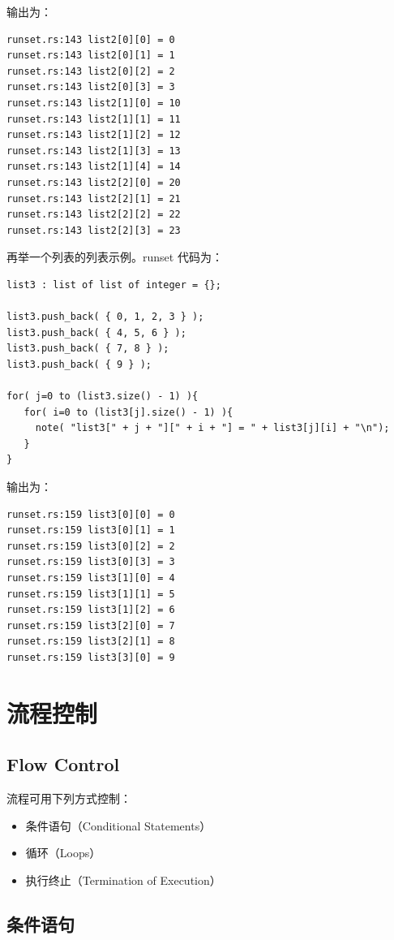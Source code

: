 输出为：
\begin{lstlisting}
runset.rs:143 list2[0][0] = 0
runset.rs:143 list2[0][1] = 1
runset.rs:143 list2[0][2] = 2
runset.rs:143 list2[0][3] = 3
runset.rs:143 list2[1][0] = 10
runset.rs:143 list2[1][1] = 11
runset.rs:143 list2[1][2] = 12
runset.rs:143 list2[1][3] = 13
runset.rs:143 list2[1][4] = 14
runset.rs:143 list2[2][0] = 20
runset.rs:143 list2[2][1] = 21
runset.rs:143 list2[2][2] = 22
runset.rs:143 list2[2][3] = 23
\end{lstlisting}

再举一个列表的列表示例。runset 代码为：
\begin{lstlisting}[style=pxl]
list3 : list of list of integer = {};

list3.push_back( { 0, 1, 2, 3 } );
list3.push_back( { 4, 5, 6 } );
list3.push_back( { 7, 8 } );
list3.push_back( { 9 } );

for( j=0 to (list3.size() - 1) ){
   for( i=0 to (list3[j].size() - 1) ){
     note( "list3[" + j + "][" + i + "] = " + list3[j][i] + "\n");
   }
}
\end{lstlisting}

输出为：
\begin{lstlisting}
runset.rs:159 list3[0][0] = 0
runset.rs:159 list3[0][1] = 1
runset.rs:159 list3[0][2] = 2
runset.rs:159 list3[0][3] = 3
runset.rs:159 list3[1][0] = 4
runset.rs:159 list3[1][1] = 5
runset.rs:159 list3[1][2] = 6
runset.rs:159 list3[2][0] = 7
runset.rs:159 list3[2][1] = 8
runset.rs:159 list3[3][0] = 9
\end{lstlisting}

\section{流程控制}
\subsection*{Flow Control}

流程可用下列方式控制：
\begin{itemize}
  \item 条件语句（Conditional Statements）
  \item 循环（Loops）
  \item 执行终止（Termination of Execution）
\end{itemize}

\subsection{条件语句}
